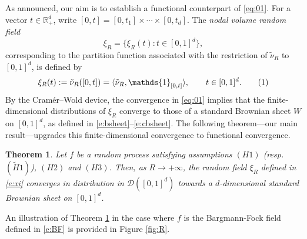 \documentclass[11pt,a4paper]{article}
\newcommand\R{\mathbb{R}}
\newcommand\Dd{\mathcal{D}}
\newcommand\nut{\tilde{\nu}}
\newcommand\one{\mathds{1}}
\newcommand\numberthis{\addtocounter{equation}{1}\tag{\theequation}}
\numberwithin{equation}{section}
\theoremstyle{plain}
\newtheorem{theo}{Theorem}[section]
\newenvironment{theorem}%
  {\begin{mdframed}[backgroundcolor=white]\begin{theo}}%
  {\end{theo}\par\vspace{0.1cm}\end{mdframed}}
\theoremstyle{plain}
\theoremstyle{plain}
\theoremstyle{plain}
\theoremstyle{definition}
\theoremstyle{definition}
\begin{document}
As announced, our aim is to establish a functional counterpart of \eqref{eq:01}.  
For a vector $t\in\R_+^d$, write $[0,t]=[0,t_1]\times\cdots\times[0,t_d]$.  
The {\it nodal volume random field}
\[
\xi_R=\{\xi_R(t):t\in[0,1]^d\},
\]
corresponding to the partition function associated with the restriction of $\nut_R$ to $[0,1]^d$, is defined by
\[
\xi_R(t):=\nut_R([0,t])
= \langle \nut_R,\one_{[0,t]}\rangle,
\qquad t\in[0,1]^d. \numberthis\label{e:xi}
\]
By the Cramér--Wold device, the convergence in \eqref{eq:01} implies that the finite-dimensional 
distributions of $\xi_R$ converge to those of a standard Brownian sheet $W$ on $[0,1]^d$, 
as defined in \eqref{e:bsheet}--\eqref{e:cbsheet}. The following theorem---our main result---upgrades this finite-dimensional convergence to functional convergence.

\begin{theorem}
\label{thm1}
Let $f$ be a random process satisfying assumptions $(H1)$ (resp. $(\widetilde{H}1)$), $(H2)$ and $(H3)$. Then, as $R\to+\infty$, the random field $\xi_R$ defined in \eqref{e:xi} converges in distribution in $\Dd([0,1]^d)$ towards a $d$-dimensional standard Brownian sheet on $[0,1]^d$.
\end{theorem}

An illustration of Theorem \ref{thm1} in the case where $f$ is the Bargmann-Fock field defined in \eqref{e:BF}  is provided in Figure \ref{fig:R}. 
\end{document}
